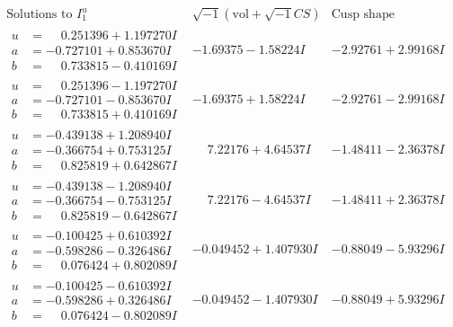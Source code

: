 \documentclass[1p]{elsarticle_modified}
\theoremstyle{definition}
\newcommand{\I}{\sqrt{-1}}
\begin{document}
$$\begin{array}{c|c|c}  
\text{Solutions to }I^u_{1}& \I (\text{vol} + \sqrt{-1}CS) & \text{Cusp shape}\\
 \hline 
\begin{aligned}
u &= \phantom{-}0.251396 + 1.197270 I \\
a &= -0.727101 + 0.853670 I \\
b &= \phantom{-}0.733815 - 0.410169 I\end{aligned}
 & -1.69375 - 1.58224 I & -2.92761 + 2.99168 I \\ \hline\begin{aligned}
u &= \phantom{-}0.251396 - 1.197270 I \\
a &= -0.727101 - 0.853670 I \\
b &= \phantom{-}0.733815 + 0.410169 I\end{aligned}
 & -1.69375 + 1.58224 I & -2.92761 - 2.99168 I \\ \hline\begin{aligned}
u &= -0.439138 + 1.208940 I \\
a &= -0.366754 + 0.753125 I \\
b &= \phantom{-}0.825819 + 0.642867 I\end{aligned}
 & \phantom{-}7.22176 + 4.64537 I & -1.48411 - 2.36378 I \\ \hline\begin{aligned}
u &= -0.439138 - 1.208940 I \\
a &= -0.366754 - 0.753125 I \\
b &= \phantom{-}0.825819 - 0.642867 I\end{aligned}
 & \phantom{-}7.22176 - 4.64537 I & -1.48411 + 2.36378 I \\ \hline\begin{aligned}
u &= -0.100425 + 0.610392 I \\
a &= -0.598286 - 0.326486 I \\
b &= \phantom{-}0.076424 + 0.802089 I\end{aligned}
 & -0.049452 + 1.407930 I & -0.88049 - 5.93296 I \\ \hline\begin{aligned}
u &= -0.100425 - 0.610392 I \\
a &= -0.598286 + 0.326486 I \\
b &= \phantom{-}0.076424 - 0.802089 I\end{aligned}
 & -0.049452 - 1.407930 I & -0.88049 + 5.93296 I \\ \hline\begin{aligned}

\end{aligned}
\end{array}$$
\end{document}
